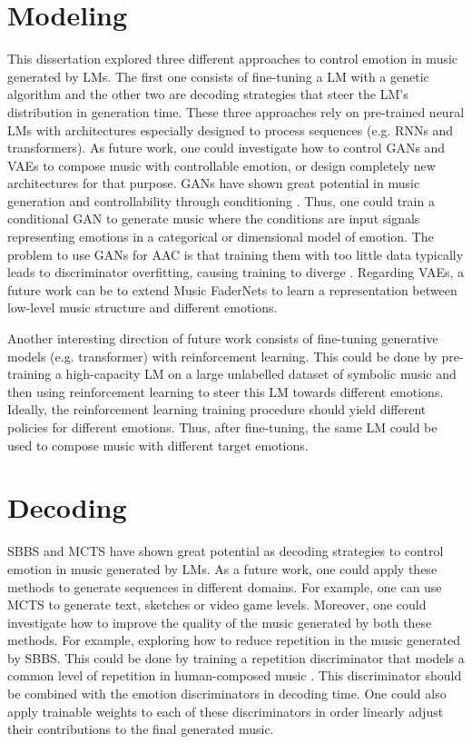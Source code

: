 \section{Modeling}

This dissertation explored three different approaches to control emotion in music generated by LMs. The first one consists of fine-tuning a LM with a genetic algorithm and the other two are decoding strategies that steer the LM's distribution in generation time. These three approaches rely on pre-trained neural LMs with architectures especially designed to process sequences (e.g. RNNs and transformers). As future work, one could investigate how to control GANs and VAEs to compose music with controllable emotion, or design completely new architectures for that purpose. GANs have shown great potential in music generation \cite{muhamed2021symbolic} and controllability through conditioning \cite{}. Thus, one could train a conditional GAN to generate music where the conditions are input signals representing emotions in a categorical or dimensional model of emotion. The problem to use GANs for AAC is that training them with too little data typically leads to discriminator overfitting, causing training to diverge \cite{karras2020training}. Regarding VAEs, a future work can be to extend Music FaderNets \cite{tan2020music} to learn a representation between low-level music structure and different emotions.

Another interesting direction of future work consists of fine-tuning generative models (e.g. transformer) with reinforcement learning. This could be done by pre-training a high-capacity LM on a large unlabelled dataset of symbolic music and then using reinforcement learning to steer this LM towards different emotions. Ideally, the reinforcement learning training procedure should yield different policies for different emotions. Thus, after fine-tuning, the same LM could be used to compose music with different target emotions.

\section{Decoding}

SBBS and MCTS have shown great potential as decoding strategies to control emotion in music generated by LMs. As a future work, one could apply these methods to generate sequences in different domains. For example, one can use MCTS to generate text, sketches or video game levels. Moreover, one could investigate how to improve the quality of the music generated by both these methods. For example, exploring how to reduce repetition in the music generated by SBBS. This could be done by training a repetition discriminator that models a common level of repetition in human-composed music \cite{holtzman2018learning}. This discriminator should be combined with the emotion discriminators in decoding time. One could also apply trainable weights to each of these discriminators in order linearly adjust their contributions to the final generated music.

